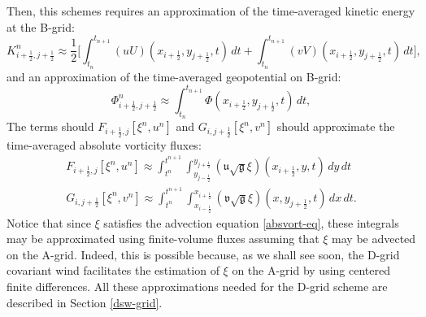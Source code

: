 Then, this schemes requires an approximation of the time-averaged kinetic energy at the B-grid:
\begin{equation}
	\label{ke-bgrid}
	K_{i+\frac{1}{2},j+\frac{1}{2}}^n \approx \frac{1}{2}\bigg[
	\int_{t_{n}}^{t_{n+1}} ({u}{U})(x_{i+\frac{1}{2}}, y_{j+\frac{1}{2}}, t) \,dt +
	\int_{t_{n}}^{t_{n+1}} ({v}{V})(x_{i+\frac{1}{2}}, y_{j+\frac{1}{2}}, t) \,dt\bigg],
\end{equation}
and an approximation of the time-averaged geopotential on B-grid:
\begin{equation}
	\label{geop-bgrid}
	\Phi_{i+\frac{1}{2},j+\frac{1}{2}}^n \approx
	\int_{t_{n}}^{t_{n+1}} \Phi
	(x_{i+\frac{1}{2}}, y_{j+\frac{1}{2}}, t) \,dt,
\end{equation}
The terms should $F_{i+\frac{1}{2},j}[\xi^{n}, u^n]$ and $G_{i,j+\frac{1}{2}}[\xi^{n}, v^n] $ should approximate the time-averaged absolute vorticity fluxes:
\begin{align}
	F_{i+\frac{1}{2},j}[\xi^{n}, u^n] \approx
	\int_{t^n}^{t^{n+1}} 
	\int_{y_{j-\frac{1}{2}}}^{y_{j+\frac{1}{2}}} 
	{(\mathfrak{u}\sqrt{\mathfrak{g}}\xi)(x_{i+\frac{1}{2}}, y, t)}
	\,dy \,dt \\
	G_{i,j+\frac{1}{2}}[\xi^{n}, v^n] \approx
	\int_{t^n}^{t^{n+1}} 
    \int_{x_{i-\frac{1}{2}}}^{x_{i+\frac{1}{2}}} 
    {(\mathfrak{v}\sqrt{\mathfrak{g}}\xi)(x, y_{j+\frac{1}{2}}, t)}
    \,dx \,dt.
\end{align}
Notice that since $\xi$ satisfies the advection equation \eqref{absvort-eq}, 
these integrals may be approximated using finite-volume fluxes assuming that $\xi$ may be advected on the A-grid.
Indeed, this is possible because, as we shall see soon, the  D-grid covariant wind facilitates the estimation of $\xi$ on the A-grid by using centered finite differences.
All these approximations needed for the D-grid scheme are described in Section \ref{dsw-grid}.


